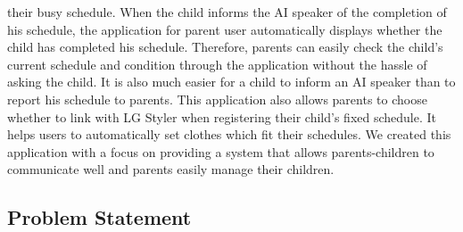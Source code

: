 \documentclass[conference]{IEEEtran}
\begin{document}
their busy schedule. When the child informs the AI speaker of the completion of his schedule, the application for parent user automatically displays whether the child has completed his schedule. Therefore, parents can easily check the child's current schedule and condition through the application without the hassle of asking the child.  It is also much easier for a child to inform an AI speaker than to report his schedule to parents. This application also allows parents to choose whether to link with LG Styler when registering their child's fixed schedule. It helps users to automatically set clothes which fit their schedules. We created this application with a focus on providing a system that allows parents-children to communicate well and parents easily manage their children.

\subsection{Problem Statement}
\end{document}
